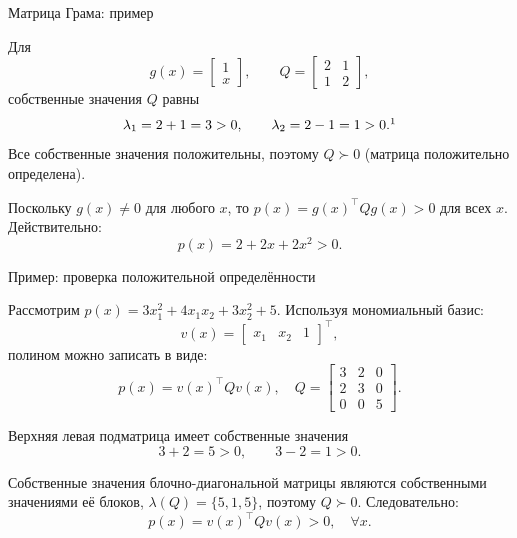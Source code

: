 \documentclass{beamer}
\begin{document}
\begin{frame}{Матрица Грама: пример}
	\begin{flushleft}
		
		Для
		\[
		g(x)=
		\begin{bmatrix}
			1\\x
		\end{bmatrix},
		\qquad
		Q=
		\begin{bmatrix}
			2&1\\
			1&2
		\end{bmatrix},
		\]
		собственные значения $Q$ равны
		\[
		\lambda_1=2+1=3>0,
		\qquad
		\lambda_2=2-1=1>0.\footnotemark
		\]
		Все собственные значения положительны, поэтому $Q\succ0$ (матрица положительно определена).
		
		
		\bigskip
		
		Поскольку $g(x)\neq0$ для любого $x$, то $p(x)=g(x)^\top Qg(x)>0$ для всех $x$. Действительно:
		\[
		p(x)=2+2x+2x^2>0.
		\]
		
		
		
	\end{flushleft}
\end{frame}


\begin{frame}{Пример: проверка положительной определённости}
	\begin{flushleft}
		Рассмотрим $p(x)=3x_1^2+4x_1x_2+3x_2^2+5$. Используя мономиальный базис:
		\[
		v(x)=
		\begin{bmatrix}
			x_1 & x_2 & 1
		\end{bmatrix}^\top,
		\]
		полином можно записать в виде:
		\[
		p(x)=v(x)^\top Qv(x), \quad 
		Q=
		\begin{bmatrix}
			3&2&0\\
			2&3&0\\
			0&0&5
		\end{bmatrix}.
		\]
		
		Верхняя левая подматрица имеет собственные значения
		\[
		3+2=5>0,
		\qquad
		3-2=1>0.
		\]
		
		Собственные значения блочно-диагональной матрицы являются собственными значениями
		её блоков, $\lambda(Q)=\{5,1,5\}$, поэтому $Q \succ 0$. Следовательно:
		\[
		p(x)=v(x)^\top Qv(x)>0, \quad \forall x.
		\]
		
	\end{flushleft}
\end{frame}
\end{document}
